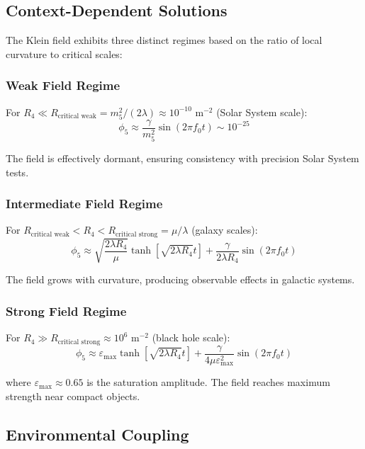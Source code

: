 \documentclass[12pt]{iopart}
\begin{document}
\subsection{Context-Dependent Solutions}

The Klein field exhibits three distinct regimes based on the ratio of local curvature to critical scales:

\subsubsection{Weak Field Regime}
For $R_4 \ll R_{\text{critical weak}} = m_5^2/(2\lambda) \approx 10^{-10}$ m$^{-2}$ (Solar System scale):
\begin{equation}
\phi_5 \approx \frac{\gamma}{m_5^2} \sin(2\pi f_0 t) \sim 10^{-25}
\label{eq:weak_regime}
\end{equation}

The field is effectively dormant, ensuring consistency with precision Solar System tests.

\subsubsection{Intermediate Field Regime} 
For $R_{\text{critical weak}} < R_4 < R_{\text{critical strong}} = \mu/\lambda$ (galaxy scales):
\begin{equation}
\phi_5 \approx \sqrt{\frac{2\lambda R_4}{\mu}} \tanh[\sqrt{2\lambda R_4}t] + \frac{\gamma}{2\lambda R_4} \sin(2\pi f_0 t)
\label{eq:intermediate_regime}
\end{equation}

The field grows with curvature, producing observable effects in galactic systems.

\subsubsection{Strong Field Regime}
For $R_4 \gg R_{\text{critical strong}} \approx 10^6$ m$^{-2}$ (black hole scale):
\begin{equation}
\phi_5 \approx \varepsilon_{\max} \tanh[\sqrt{2\lambda R_4}t] + \frac{\gamma}{4\mu\varepsilon_{\max}^2} \sin(2\pi f_0 t)
\label{eq:strong_regime}
\end{equation}

where $\varepsilon_{\max} \approx 0.65$ is the saturation amplitude. The field reaches maximum strength near compact objects.

\subsection{Environmental Coupling}
\end{document}

